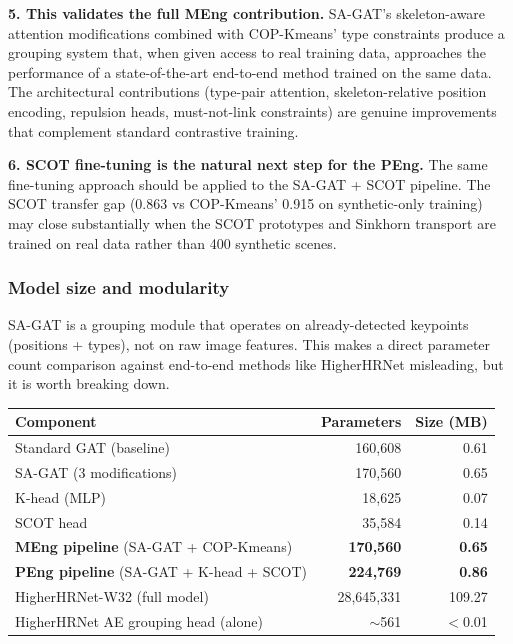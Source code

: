 \textbf{5. This validates the full MEng contribution.} SA-GAT's skeleton-aware attention modifications combined with COP-Kmeans' type constraints produce a grouping system that, when given access to real training data, approaches the performance of a state-of-the-art end-to-end method trained on the same data. The architectural contributions (type-pair attention, skeleton-relative position encoding, repulsion heads, must-not-link constraints) are genuine improvements that complement standard contrastive training.

\textbf{6. SCOT fine-tuning is the natural next step for the PEng.} The same fine-tuning approach should be applied to the SA-GAT + SCOT pipeline. The SCOT transfer gap (0.863 vs COP-Kmeans' 0.915 on synthetic-only training) may close substantially when the SCOT prototypes and Sinkhorn transport are trained on real data rather than 400 synthetic scenes.


\subsubsection{Model size and modularity}

SA-GAT is a grouping module that operates on already-detected keypoints (positions + types), not on raw image features. This makes a direct parameter count comparison against end-to-end methods like HigherHRNet misleading, but it is worth breaking down.

\begin{tabular}{lrr}
\hline
\textbf{Component} & \textbf{Parameters} & \textbf{Size (MB)} \\
\hline
Standard GAT (baseline) & 160,608 & 0.61 \\
SA-GAT (3 modifications) & 170,560 & 0.65 \\
K-head (MLP) & 18,625 & 0.07 \\
SCOT head & 35,584 & 0.14 \\
\hline
\textbf{MEng pipeline} (SA-GAT + COP-Kmeans) & \textbf{170,560} & \textbf{0.65} \\
\textbf{PEng pipeline} (SA-GAT + K-head + SCOT) & \textbf{224,769} & \textbf{0.86} \\
\hline
HigherHRNet-W32 (full model) & 28,645,331 & 109.27 \\
HigherHRNet AE grouping head (alone) & $\sim$561 & $<$0.01 \\
\hline
\end{tabular}

\vspace{0.5em}

